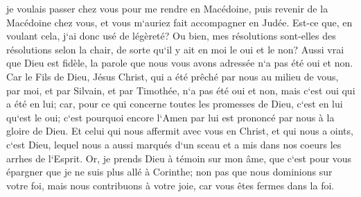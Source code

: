 \verse je voulais passer chez vous pour me rendre en Macédoine, puis revenir de la Macédoine chez vous, et vous m`auriez fait accompagner en Judée. 
\verse Est-ce que, en voulant cela, j`ai donc usé de légèreté? Ou bien, mes résolutions sont-elles des résolutions selon la chair, de sorte qu`il y ait en moi le oui et le non? 
\verse Aussi vrai que Dieu est fidèle, la parole que nous vous avons adressée n`a pas été oui et non. 
\verse Car le Fils de Dieu, Jésus Christ, qui a été prêché par nous au milieu de vous, par moi, et par Silvain, et par Timothée, n`a pas été oui et non, mais c`est oui qui a été en lui; 
\verse car, pour ce qui concerne toutes les promesses de Dieu, c`est en lui qu`est le oui; c`est pourquoi encore l`Amen par lui est prononcé par nous à la gloire de Dieu. 
\verse Et celui qui nous affermit avec vous en Christ, et qui nous a oints, c`est Dieu, 
\verse lequel nous a aussi marqués d`un sceau et a mis dans nos coeurs les arrhes de l`Esprit. 
\verse Or, je prends Dieu à témoin sur mon âme, que c`est pour vous épargner que je ne suis plus allé à Corinthe; 
\verse non pas que nous dominions sur votre foi, mais nous contribuons à votre joie, car vous êtes fermes dans la foi. 

